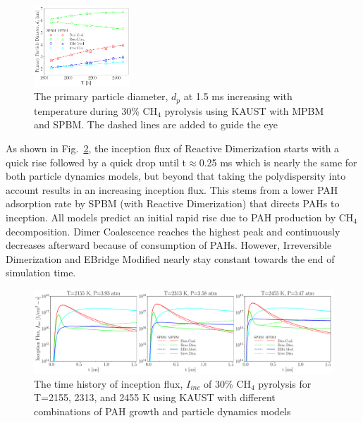 \begin{figure}[H]
	\centering
	\includegraphics[width=0.32\textwidth]{Figures/Results/Shocktube/Stanford/june/30CH4_sootdp_kaust_1.5ms.pdf}
	\caption{The primary particle diameter, $d_p$ at 1.5 ms increasing with temperature during 30\% $\mathrm{CH_4}$ pyrolysis using KAUST with MPBM and SPBM. The dashed lines are added to guide the eye}
	\label{fig:shocktubest_30ch4_dp_kaust_last} 
\end{figure}

As shown in Fig.~\ref{fig:shocktubest_30ch4_Iinc_kaust_subset}, the inception flux of Reactive Dimerization starts with a quick rise followed by a quick drop until t$\approx$0.25 ms which is nearly the same for both particle dynamics models, but beyond that taking the polydispersity into account results in an increasing inception flux. This stems from a lower PAH adsorption rate by SPBM (with Reactive Dimerization) that directs PAHs to inception. All models predict an initial rapid rise due to PAH production by $\mathrm{CH_4}$ decomposition.  Dimer Coalescence reaches the highest peak and continuously decreases afterward because of consumption of PAHs. However, Irreversible Dimerization and EBridge Modified nearly stay constant towards the end of simulation time. 

\begin{figure}[H]
	\centering
	\includegraphics[width=1\textwidth]{Figures/Results/Shocktube/Stanford/june/30CH4_sootIinc_kaust_subset.pdf}
	\caption{The time history of inception flux, $I_{inc}$ of 30\% $\mathrm{CH_4}$ pyrolysis for T=2155, 2313, and 2455 K using KAUST with different combinations of PAH growth and particle dynamics models}
	\label{fig:shocktubest_30ch4_Iinc_kaust_subset} 
\end{figure}


